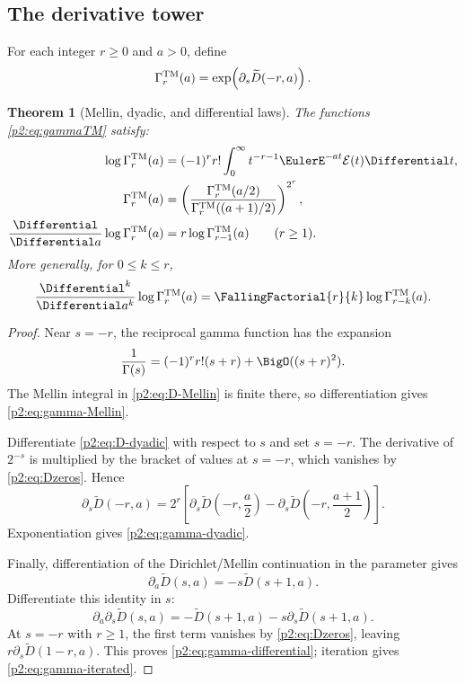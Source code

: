 \documentclass[11pt,oneside]{article}
\numberwithin{equation}{section}
\newtheorem{theorem}{Theorem}[section]
\theoremstyle{definition}
\theoremstyle{remark}
\begin{document}
\subsection{The derivative tower}

\begin{definition}
For each integer $r\ge0$ and $a>0$, define
\begin{equation}
 \Gamma_r^{\rm TM}(a)
 =\exp\!\left(\partial_s\widetilde D(-r,a)\right).
 \label{p2:eq:gammaTM}
\end{equation}
\end{definition}

\begin{theorem}[Mellin, dyadic, and differential laws]
\label{p2:thm:gamma-tower}
The functions \eqref{p2:eq:gammaTM} satisfy:
\begin{align}
 \log\Gamma_r^{\rm TM}(a)
 &=(-1)^rr!\int_0^\infty
 t^{-r-1}\EulerE^{-at}\mathcal E(t)\Differential t,
 \label{p2:eq:gamma-Mellin}\\
 \Gamma_r^{\rm TM}(a)
 &=\left(
 \frac{\Gamma_r^{\rm TM}(a/2)}
 {\Gamma_r^{\rm TM}((a+1)/2)}
 \right)^{2^r},
 \label{p2:eq:gamma-dyadic}\\
 \frac{\Differential}{\Differential a}\log\Gamma_r^{\rm TM}(a)
 &=r\log\Gamma_{r-1}^{\rm TM}(a)
 \qquad(r\ge1).
 \label{p2:eq:gamma-differential}
\end{align}
More generally, for $0\le k\le r$,
\begin{equation}
 \frac{\Differential^k}{\Differential a^k}\log\Gamma_r^{\rm TM}(a)
 =\FallingFactorial{r}{k}\log\Gamma_{r-k}^{\rm TM}(a).
 \label{p2:eq:gamma-iterated}
\end{equation}
\newresult
\end{theorem}

\begin{proof}
Near $s=-r$, the reciprocal gamma function has the expansion
\[
 \frac1{\Gamma(s)}=(-1)^rr!(s+r)+\BigO((s+r)^2).
\]
The Mellin integral in \eqref{p2:eq:D-Mellin} is finite there, so differentiation gives
\eqref{p2:eq:gamma-Mellin}.

Differentiate \eqref{p2:eq:D-dyadic} with respect to $s$ and set $s=-r$.  The derivative of
$2^{-s}$ is multiplied by the bracket of values at $s=-r$, which vanishes by
\eqref{p2:eq:Dzeros}.  Hence
\[
 \partial_s\widetilde D(-r,a)
 =2^r\left[
 \partial_s\widetilde D\!\left(-r,\frac a2\right)
 -\partial_s\widetilde D\!\left(-r,\frac{a+1}{2}\right)
 \right].
\]
Exponentiation gives \eqref{p2:eq:gamma-dyadic}.

Finally, differentiation of the Dirichlet/Mellin continuation in the parameter gives
\[
 \partial_a\widetilde D(s,a)=-s\widetilde D(s+1,a).
\]
Differentiate this identity in $s$:
\[
 \partial_a\partial_s\widetilde D(s,a)
 =-\widetilde D(s+1,a)-s\partial_s\widetilde D(s+1,a).
\]
At $s=-r$ with $r\ge1$, the first term vanishes by \eqref{p2:eq:Dzeros}, leaving
$r\partial_s\widetilde D(1-r,a)$.  This proves \eqref{p2:eq:gamma-differential}; iteration gives
\eqref{p2:eq:gamma-iterated}.
\end{proof}
\end{document}
